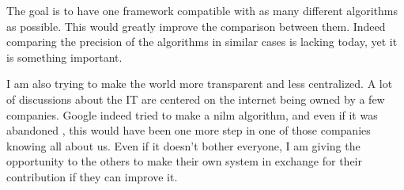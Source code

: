 The goal is to have one framework compatible with as many different algorithms as possible. This would greatly improve the comparison between them. Indeed comparing the precision of the algorithms in similar cases is lacking today, yet it is something important.

I am also trying to make the world more transparent and less centralized. A lot of discussions about the IT are centered on the internet being owned by a few companies. Google indeed tried to make a \acrshort{nilm} algorithm, and even if it was abandoned \cite{googleabandon}, this would have been one more step in one of those companies knowing all about us. Even if it doesn't bother everyone, I am giving the opportunity to the others to make their own system in exchange for their contribution if they can improve it.